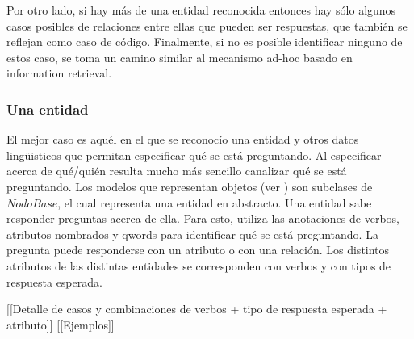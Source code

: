 Por otro lado, si hay más de una entidad reconocida entonces hay sólo algunos casos posibles de relaciones entre ellas que pueden ser respuestas, que también se reflejan como caso de código. Finalmente, si no es posible identificar ninguno de estos caso, se toma un camino similar al mecanismo ad-hoc basado en information retrieval.


\subsubsection*{Una entidad}
El mejor caso es aquél en el que se reconocío una entidad y otros datos lingüisticos que permitan especificar qué se está preguntando. Al especificar acerca de qué/quién resulta mucho más sencillo canalizar qué se está preguntando. Los modelos que representan objetos (ver ) son subclases de $NodoBase$, el cual representa una entidad en abstracto. Una entidad sabe responder preguntas acerca de ella. Para esto, utiliza las anotaciones de verbos, atributos nombrados y qwords para identificar qué se está preguntando. La pregunta puede responderse con un atributo o con una relación. Los distintos atributos de las distintas entidades se corresponden con verbos y con tipos de respuesta esperada. 

[[Detalle de casos y combinaciones de verbos + tipo de respuesta esperada + atributo]]
[[Ejemplos]]
